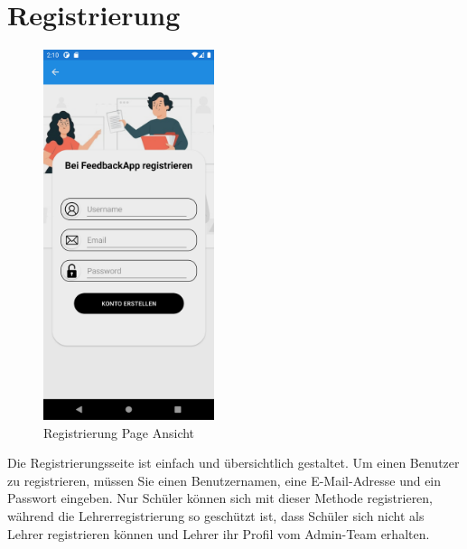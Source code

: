 \section{Registrierung}
\begin{figure}[h]
    \begin{center}
        \includegraphics[width=5cm]{pics/Xamarin Student/2 Registration Page.png}
        \caption[Registrierung]{Registrierung Page Ansicht}
    \end{center}
\end{figure}
Die Registrierungsseite ist einfach und übersichtlich gestaltet. Um einen Benutzer zu registrieren, müssen Sie einen Benutzernamen, eine E-Mail-Adresse und ein Passwort eingeben. Nur Schüler können sich mit dieser Methode registrieren, während die Lehrerregistrierung so geschützt ist, dass Schüler sich nicht als Lehrer registrieren können und Lehrer ihr Profil vom Admin-Team erhalten.
\newpage
